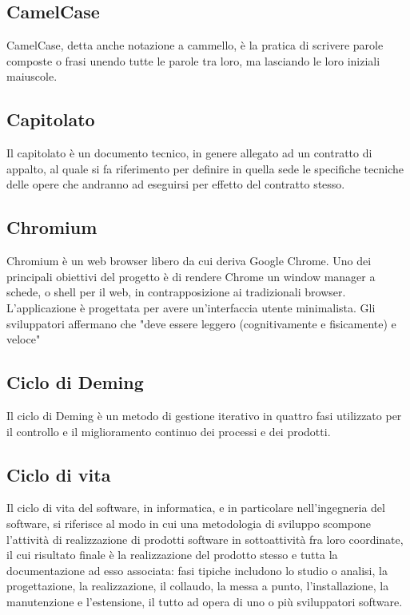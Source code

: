 
\subsection*{CamelCase}
CamelCase, detta anche notazione a cammello, è la pratica di scrivere parole composte o frasi unendo tutte le parole tra loro, ma lasciando le loro iniziali maiuscole.

\subsection*{Capitolato}
Il capitolato è un documento tecnico, in genere allegato ad un contratto di appalto, al quale si fa riferimento per definire in quella sede le specifiche tecniche delle opere che andranno ad eseguirsi per effetto del contratto stesso.

\subsection*{Chromium}
Chromium è un web browser libero da cui deriva Google Chrome.
Uno dei principali obiettivi del progetto è di rendere Chrome un window manager a schede, o shell per il web, in contrapposizione ai tradizionali browser. L'applicazione è progettata per avere un'interfaccia utente minimalista. Gli sviluppatori affermano che "deve essere leggero (cognitivamente e fisicamente) e veloce"

\subsection*{Ciclo di Deming}
Il ciclo di Deming è un metodo di gestione iterativo in quattro fasi utilizzato per il controllo e il miglioramento continuo dei processi e dei prodotti.

\subsection*{Ciclo di vita}
Il ciclo di vita del software, in informatica, e in particolare nell'ingegneria del software, si riferisce al modo in cui una metodologia di sviluppo scompone l'attività di realizzazione di prodotti software in sottoattività fra loro coordinate, il cui risultato finale è la realizzazione del prodotto stesso e tutta la documentazione ad esso associata: fasi tipiche includono lo studio o analisi, la progettazione, la realizzazione, il collaudo, la messa a punto, l'installazione, la manutenzione e l'estensione, il tutto ad opera di uno o più sviluppatori software.

